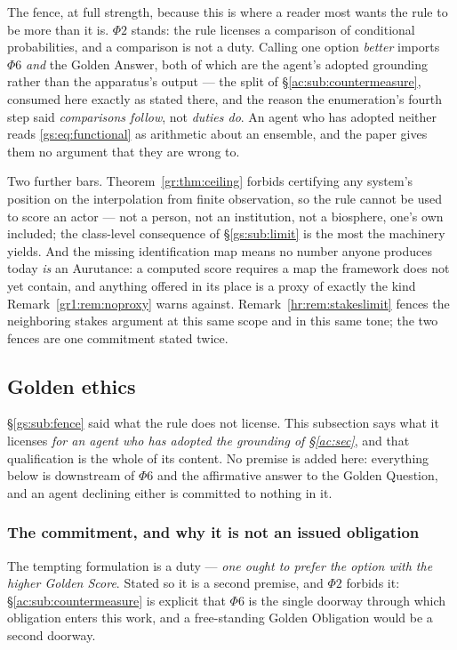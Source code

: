 \documentclass[11pt]{article}
\numberwithin{equation}{section}
\theoremstyle{plain}
\theoremstyle{definition}
\theoremstyle{remark}
\begin{document}
The fence, at full strength, because this is where a reader most wants the rule to be more than it is. $\Phi2$ stands: the rule licenses a comparison of conditional probabilities, and a comparison is not a duty. Calling one option \emph{better} imports $\Phi6$ \emph{and} the Golden Answer, both of which are the agent's adopted grounding rather than the apparatus's output --- the split of \S\ref{ac:sub:countermeasure}, consumed here exactly as stated there, and the reason the enumeration's fourth step said \emph{comparisons follow}, not \emph{duties do}. An agent who has adopted neither reads \eqref{gs:eq:functional} as arithmetic about an ensemble, and the paper gives them no argument that they are wrong to.

Two further bars. Theorem~\ref{gr:thm:ceiling} forbids certifying any system's position on the interpolation from finite observation, so the rule cannot be used to score an actor --- not a person, not an institution, not a biosphere, one's own included; the class-level consequence of \S\ref{gs:sub:limit} is the most the machinery yields. And the missing identification map means no number anyone produces today \emph{is} an Aurutance: a computed score requires a map the framework does not yet contain, and anything offered in its place is a proxy of exactly the kind Remark~\ref{gr1:rem:noproxy} warns against. Remark~\ref{hr:rem:stakeslimit} fences the neighboring stakes argument at this same scope and in this same tone; the two fences are one commitment stated twice.

\subsection{Golden ethics}\label{gs:sub:ethics}

\S\ref{gs:sub:fence} said what the rule does not license. This subsection
says what it licenses \emph{for an agent who has adopted the grounding of
\S\ref{ac:sec}}, and that qualification is the whole of its content. No
premise is added here: everything below is downstream of $\Phi6$ and the
affirmative answer to the Golden Question, and an agent declining either
is committed to nothing in it.

\subsubsection{The commitment, and why it is not an issued obligation}
\label{gs:ssub:commitment}

The tempting formulation is a duty --- \emph{one ought to prefer the
option with the higher Golden Score}. Stated so it is a second premise,
and $\Phi2$ forbids it: \S\ref{ac:sub:countermeasure} is explicit that
$\Phi6$ is the single doorway through which obligation enters this work,
and a free-standing Golden Obligation would be a second doorway.
\end{document}
